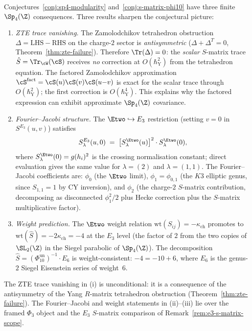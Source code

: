 \begin{remark}
\label{rem:sp4-finite-modularity-constraints}
Conjectures~\ref{conj:sp4-modularity}
and~\ref{conj:s-matrix-phi10} have three finite
$\Sp_4(\Z)$ consequences.
Three results sharpen the conjectural picture:
\begin{enumerate}[label=\textup{(\roman*)}]
 \item \emph{ZTE trace vanishing.}
 The Zamolodchikov tetrahedron obstruction $\Delta = \mathrm{LHS} - \mathrm{RHS}$
 on the charge-$2$ sector is \emph{antisymmetric}
 ($\Delta + \Delta^T = 0$, Theorem~\ref{thm:zte-failure}).
 Therefore $\Tr(\Delta) = 0$: the \emph{scalar} $S$-matrix trace
 $\hat{S} = \Tr_{\cW}(\cS)$ receives \emph{no} correction at
 $O(\hbar_{\mathrm{Y}}^2)$ from the tetrahedron equation.
 The factored Zamolodchikov approximation
 $\cS^{\mathrm{fact}} = \cS(u)\cS(v)\cS(u{-}v)$
 is exact for the scalar trace through $O(\hbar_{\mathrm{Y}}^2)$;
 the first correction is $O(\hbar_{\mathrm{Y}}^4)$.
 This explains why the factored expression can exhibit approximate
 $\Sp_4(\Z)$ covariance.

 \item \emph{Fourier--Jacobi structure.}
 The $\Etwo \hookrightarrow E_3$ restriction
 (setting $v = 0$ in $S^{E_3}(u,v)$) satisfies
 \[
 S^{E_3}_\lambda(u, 0)
 \;=\;
 \bigl[S^{\Etwo}_\lambda(u)\bigr]^2
 \cdot S^{\Etwo}_\lambda(0),
 \]
where $S^{\Etwo}_\lambda(0) = g(h_i)^2$ is the crossing
normalisation constant; direct evaluation gives the same value for
$\lambda = (2)$ and $\lambda = (1,1)$.
 The Fourier--Jacobi coefficients are:
 $\phi_0$ (the $\Etwo$ limit),
 $\phi_1 = \phi_{0,1}$ (the $K3$ elliptic genus, since
 $S_{1,1} = 1$ by CY inversion), and
 $\phi_2$ (the charge-$2$ $S$-matrix contribution,
 decomposing as disconnected $\phi_1^2/2$ plus Hecke
 correction plus the $S$-matrix multiplicative factor).

 \item \emph{Weight prediction.}
 The $\Etwo$ weight relation $\mathrm{wt}(S_{ij}) = -\kappa_{\mathrm{ch}}$
 promotes to $\mathrm{wt}(\hat{S}) = -2\kappa_{\mathrm{ch}} = -4$
 at the $E_3$ level (the factor of $2$ from the two copies of
 $\SL_2(\Z)$ in the Siegel parabolic of $\Sp_4(\Z)$).
 The decomposition
 $\hat{S} = (\Phi_{10}^{\mathrm{un}})^{-1} \cdot E_6$
 is weight-consistent:
 $-4 = -10 + 6$, where $E_6$ is the genus-$2$ Siegel
 Eisenstein series of weight~$6$.
\end{enumerate}
The ZTE trace vanishing in \textup{(i)} is unconditional: it is a
consequence of the antisymmetry of the Yang $R$-matrix tetrahedron
obstruction (Theorem~\ref{thm:zte-failure}). The Fourier--Jacobi and
weight statements in \textup{(ii)--(iii)} lie over the framed $\Phi_3$
object and the $E_3$ $S$-matrix comparison of
Remark~\ref{rem:e3-s-matrix-scope}.
\end{remark}

